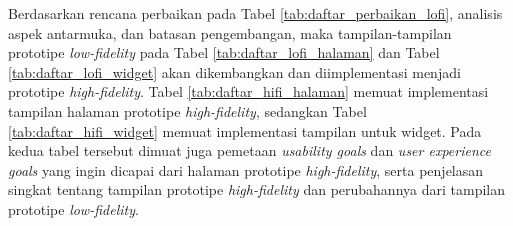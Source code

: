 




Berdasarkan rencana perbaikan pada Tabel \ref{tab:daftar_perbaikan_lofi}, analisis aspek antarmuka, dan batasan pengembangan, maka tampilan-tampilan prototipe \textit{low-fidelity} pada Tabel \ref{tab:daftar_lofi_halaman} dan Tabel \ref{tab:daftar_lofi_widget} akan dikembangkan dan diimplementasi menjadi prototipe \textit{high-fidelity}. Tabel \ref{tab:daftar_hifi_halaman} memuat implementasi tampilan halaman prototipe \textit{high-fidelity}, sedangkan Tabel \ref{tab:daftar_hifi_widget} memuat implementasi tampilan untuk widget. Pada kedua tabel tersebut dimuat juga pemetaan \textit{usability goals} dan \textit{user experience goals} yang ingin dicapai dari halaman prototipe \textit{high-fidelity}, serta penjelasan singkat tentang tampilan prototipe \textit{high-fidelity} dan perubahannya dari tampilan prototipe \textit{low-fidelity}.


\newlength{\hifiwidth}
\setlength{\hifiwidth}{0.315\textwidth}

\newlength{\hifidescwidth}
\setlength{\hifidescwidth}{0.315\textwidth}

\newcommand{\hifidesc}[1]{\desc{\hifidescwidth}{#1}}

\newcommand{\hifi}[1]{\begin{center}\texttt{[image: \#1]}\end{center}}
\newcommand{\hifiwidget}[2]{\begin{center}\texttt{[image: \#2]}\end{center}}

